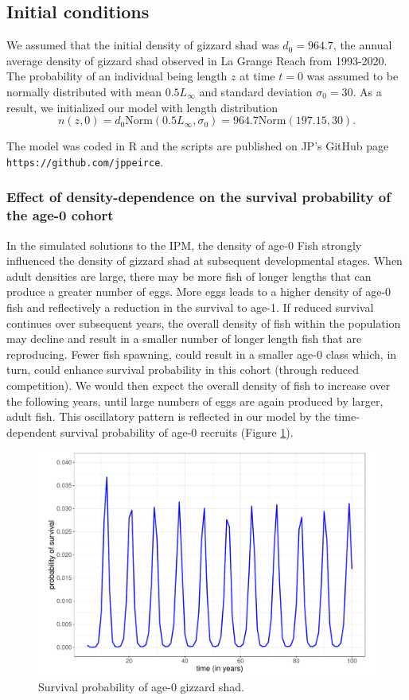 \documentclass[preprint,review,12pt,authoryear]{elsarticle}
\begin{document}
\subsection{Initial conditions}  We assumed that the initial density of gizzard shad was $d_0 = 964.7$, the annual average density of gizzard shad observed in La Grange Reach from 1993-2020.  
The probability of an individual being length $z$ at time $t=0$  was assumed to be normally distributed with mean $0.5L_\infty$ and standard deviation $\sigma_0 = 30$.  
As a result, we initialized our model with length distribution
\begin{equation}\label{eq:n}
 n(z,0) = d_0 \mbox{Norm} (0.5 L_\infty, \sigma_0) = 964.7 \mbox{Norm} (197.15, 30). 
 \end{equation}

The model was coded in R \citep{R} and the scripts are published on JP's GitHub page \verb+https://github.com/jppeirce+.

\subsubsection{Effect of density-dependence on the survival probability of the age-0 cohort} \label{sec:survival}

In the simulated solutions to the IPM, the density of age-0 Fish strongly influenced the density of gizzard shad at subsequent developmental stages.
When adult densities are large, there may be more fish of longer lengths that can produce a greater number of eggs.  
More eggs leads to a higher density of age-0 fish and reflectively a reduction in the survival to age-1. 
If reduced survival continues over subsequent years, the overall density of fish within the population may decline and result in a smaller number of longer length fish that are reproducing.  
Fewer fish spawning, could result in a smaller age-0 class which, in turn, could enhance survival probability in this cohort (through reduced competition). 
We would then expect the overall density of fish to increase over the following years, until large numbers of eggs are again produced by larger, adult fish.  
This oscillatory pattern is reflected in our model by the time-dependent survival probability of age-0 recruits (Figure \ref{fig:age0time}).

\begin{figure}
\centering
  \includegraphics[width=.4\textwidth]{figures/Figure2a.pdf}
   \caption{}
  \label{fig:age0time}
 
\caption{Survival probability of age-0 gizzard shad.}

\end{figure}    
\end{document}
